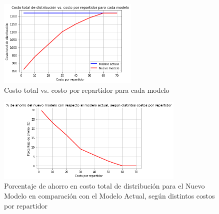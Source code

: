 \documentclass{article}
\begin{document}
    \begin{table}[H]
    \centering
    \caption{Comparación de costos entre metodologías para distintos costos por repartidor}
    \end{table}
    
    
    \begin{figure}[H] 
        \centering
        \includegraphics[width=0.6\textwidth]{costo_tot_vs_costo_rep.png}
        \caption{Costo total vs. costo por repartidor para cada modelo}
        \label{fig:mi-imagen}
    \end{figure}
    
    
    \begin{figure}[H] 
        \centering
        \includegraphics[width=0.8\textwidth]{porcentaje_ahorro_vs_costo_rep.png}
        \caption{Porcentaje de ahorro en costo total de distribución para el Nuevo Modelo en comparación con el Modelo Actual, según distintos costos por repartidor}
        \label{fig:mi-imagen}
    \end{figure}
    
\end{document}
